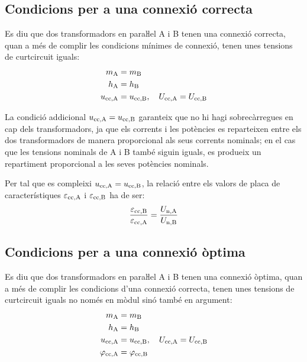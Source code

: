 \subsection{Condicions per a una connexió correcta}
 Es diu que dos transformadors en paraŀlel  A i B tenen una connexió correcta, quan a més de complir les condicions mínimes de connexió, tenen unes tensions de curtcircuit iguals:
\begin{align}
    m_\mathrm{A} &= m_\mathrm{B}\\
    h_\mathrm{A} &= h_\mathrm{B}\\
    u_\mathrm{cc,A} &= u_\mathrm{cc,B}, \quad U_\mathrm{cc,A} = U_\mathrm{cc,B}
\end{align}

La condició addicional  $u_\mathrm{cc,A} = u_\mathrm{cc,B}$ garanteix que no hi hagi sobrecàrregues en cap dels transformadors, ja que els corrents i les potències es reparteixen entre els dos transformadors de manera proporcional als seus corrents nominals; en el cas que les tensions nominals de A i B també siguin  iguals, es produeix un repartiment proporcional a les seves potències nominals.

Per tal que es compleixi $u_\mathrm{cc,A} = u_\mathrm{cc,B}$, la relació entre els valors de placa de característiques $\varepsilon_\mathrm{cc,A}$ i $\varepsilon_\mathrm{cc,B}$ ha de ser:
\begin{equation}
    \frac{\varepsilon_\mathrm{cc,B}}{\varepsilon_\mathrm{cc,A}} = \frac{U_\mathrm{n,A}}{U_\mathrm{n,B}}
\end{equation}

\subsection{Condicions per a una connexió òptima}

 Es diu que dos transformadors en paraŀlel A i B tenen una connexió òptima, quan a més de complir les condicions d'una connexió correcta, tenen unes tensions de curtcircuit iguals no només en mòdul sinó també en argument:
\begin{align}
    m_\mathrm{A} &= m_\mathrm{B}\\
    h_\mathrm{A} &= h_\mathrm{B}\\
    u_\mathrm{cc,A} &= u_\mathrm{cc,B}, \quad U_\mathrm{cc,A} = U_\mathrm{cc,B}\\
    \varphi_\mathrm{cc,A} &=\varphi_\mathrm{cc,B}
\end{align}

